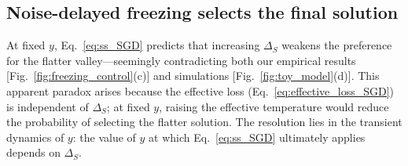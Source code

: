 \documentclass[aps,prx,reprint,superscriptaddress,longbibliography,nofootinbib,floatfix]{revtex4-2}
\begin{document}
\subsection{Noise-delayed freezing selects the final solution}
At fixed $y$, Eq.~\ref{eq:ss_SGD} predicts that increasing $\Delta_S$ weakens the preference for the flatter valley---seemingly contradicting both our empirical results [Fig.~\ref{fig:freezing_control}(c)] and simulations [Fig.~\ref{fig:toy_model}(d)]. This apparent paradox arises because the effective loss (Eq.~\ref{eq:effective_loss_SGD}) is independent of $\Delta_S$; at fixed $y$, raising the effective temperature would reduce the probability of selecting the flatter solution. The resolution lies in the transient dynamics of $y$: the value of $y$ at which Eq.~\ref{eq:ss_SGD} ultimately applies depends on $\Delta_S$.
\end{document}
